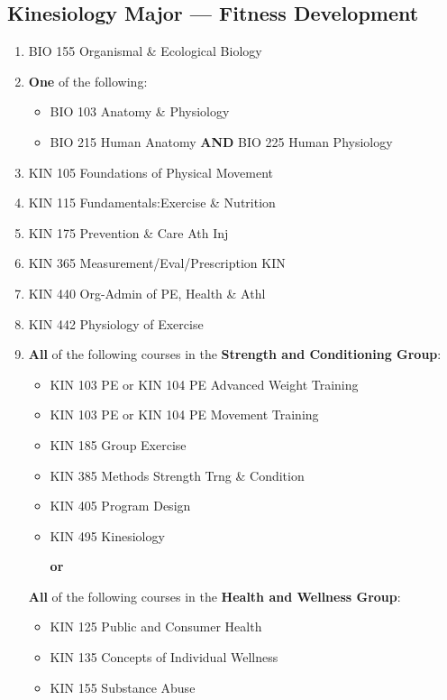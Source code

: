 \documentclass[
  letterpaper,
]{scrbook}
\providecommand{\tightlist}{%
  \setlength{\itemsep}{0pt}\setlength{\parskip}{0pt}}
\begin{document}
\subsection{Kinesiology Major --- Fitness
Development}\label{kinesiology-major-fitness-development}

\begin{enumerate}
\def\labelenumi{\arabic{enumi}.}
\tightlist
\item
  BIO 155 Organismal \& Ecological Biology
\item
  \textbf{One} of the following:

  \begin{itemize}
  \tightlist
  \item
    BIO 103 Anatomy \& Physiology
  \item
    BIO 215 Human Anatomy \textbf{AND} BIO 225 Human Physiology
  \end{itemize}
\item
  KIN 105 Foundations of Physical Movement
\item
  KIN 115 Fundamentals:Exercise \& Nutrition
\item
  KIN 175 Prevention \& Care Ath Inj
\item
  KIN 365 Measurement/Eval/Prescription KIN
\item
  KIN 440 Org-Admin of PE, Health \& Athl
\item
  KIN 442 Physiology of Exercise
\item
  \textbf{All} of the following courses in the \textbf{Strength and
  Conditioning Group}:

  \begin{itemize}
  \item
    KIN 103 PE or KIN 104 PE Advanced Weight Training
  \item
    KIN 103 PE or KIN 104 PE Movement Training
  \item
    KIN 185 Group Exercise
  \item
    KIN 385 Methods Strength Trng \& Condition
  \item
    KIN 405 Program Design
  \item
    KIN 495 Kinesiology

    \textbf{or}
  \end{itemize}

  \textbf{All} of the following courses in the \textbf{Health and
  Wellness Group}:

  \begin{itemize}
  \tightlist
  \item
    KIN 125 Public and Consumer Health
  \item
    KIN 135 Concepts of Individual Wellness
  \item
    KIN 155 Substance Abuse
  \end{itemize}
\end{enumerate}
\end{document}
